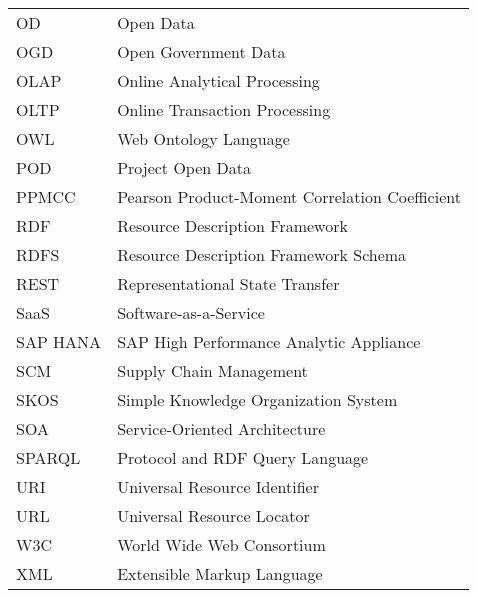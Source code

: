 \begin{longtable}{lp{9cm}}
 OD & Open Data\\
 OGD & Open Government Data\\
 OLAP & Online Analytical Processing \\
 OLTP & Online Transaction Processing \\
 OWL &  Web Ontology Language \\
 POD & Project Open Data \\
 PPMCC & Pearson Product-Moment Correlation Coefficient \\
 RDF  & Resource Description Framework\\
 RDFS & Resource Description Framework Schema \\
 REST & Representational State Transfer\\
 SaaS & Software-as-a-Service \\
 SAP HANA & SAP High Performance Analytic Appliance \\
 SCM & Supply Chain Management\\
 SKOS &  Simple Knowledge Organization System \\
 SOA & Service-Oriented Architecture\\
 SPARQL & Protocol and RDF Query Language \\
 URI & Universal Resource Identifier \\
 URL & Universal Resource Locator \\
 W3C & World Wide Web Consortium \\
 XML & Extensible Markup Language
\end{longtable}

